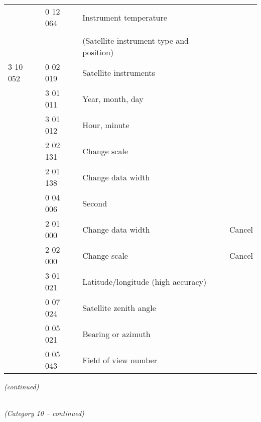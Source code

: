 \begin{longtable}[]{@{}llll@{}}
& 0 12 064 & Instrument temperature &\tabularnewline
& & &\tabularnewline
& & (Satellite instrument type and position) &\tabularnewline
3 10 052 & 0 02 019 & Satellite instruments &\tabularnewline
& 3 01 011 & Year, month, day &\tabularnewline
& 3 01 012 & Hour, minute &\tabularnewline
& 2 02 131 & Change scale &\tabularnewline
& 2 01 138 & Change data width &\tabularnewline
& 0 04 006 & Second &\tabularnewline
& 2 01 000 & Change data width & Cancel\tabularnewline
& 2 02 000 & Change scale & Cancel\tabularnewline
& 3 01 021 & Latitude/longitude (high accuracy) &\tabularnewline
& 0 07 024 & Satellite zenith angle &\tabularnewline
& 0 05 021 & Bearing or azimuth &\tabularnewline
& 0 05 043 & Field of view number &\tabularnewline
\bottomrule
\end{longtable}

\emph{(continued)}

\emph{\\
(Category 10 -- continued)}

